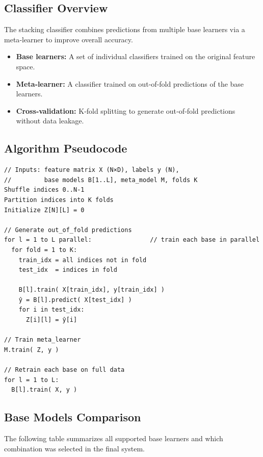 \documentclass[a4paper,12pt]{article}
\begin{document}
\subsection{Classifier Overview}
The stacking classifier combines predictions from multiple base learners via a meta‐learner to improve overall accuracy.  
\begin{itemize}
  \item \textbf{Base learners:} A set of individual classifiers trained on the original feature space.
  \item \textbf{Meta‐learner:} A classifier trained on out‐of‐fold predictions of the base learners.
  \item \textbf{Cross‐validation:} K‐fold splitting to generate out‐of‐fold predictions without data leakage.
\end{itemize}

\subsection{Algorithm Pseudocode}
\begin{lstlisting}
// Inputs: feature matrix X (N×D), labels y (N), 
//         base models B[1..L], meta_model M, folds K
Shuffle indices 0..N-1
Partition indices into K folds
Initialize Z[N][L] = 0

// Generate out_of_fold predictions
for l = 1 to L parallel:                // train each base in parallel
  for fold = 1 to K:
    train_idx = all indices not in fold
    test_idx  = indices in fold

    B[l].train( X[train_idx], y[train_idx] )
    ŷ = B[l].predict( X[test_idx] )
    for i in test_idx:
      Z[i][l] = ŷ[i]

// Train meta_learner
M.train( Z, y )

// Retrain each base on full data
for l = 1 to L:
  B[l].train( X, y )
\end{lstlisting}

\subsection{Base Models Comparison}
The following table summarizes all supported base learners and which combination was selected in the final system.
\end{document}
